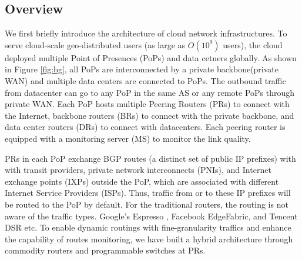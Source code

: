 \subsection{Overview}  %
We first briefly introduce the architecture of cloud network infrastructures. To serve cloud-scale geo-distributed users (as large as $O(10^{9})$ users), the cloud deployed multiple Point of Presences (PoPs) and data cetners globally. As shown in Figure \ref{fig:bg}, all PoPs are interconnected by a private backbone(private WAN) and multiple data centers are connected to PoPs. The outbound traffic from datacenter can go to any PoP in the same AS or any remote PoPs through private WAN. Each PoP hosts multiple Peering Routers (PRs) to connect with the Internet, backbone routers (BRs) to connect with the private backbone, and data center routers (DRs) to connect with datacenters. Each peering router is equipped with a monitoring server (MS) to monitor the link quality.

PRs in each PoP exchange BGP routes (a distinct set of public IP prefixes) with with transit providers, private network interconnects (PNIs), and Internet exchange points (IXPs) outside the PoP, which are associated with different Internet Service Providers (ISPs). Thus, traffic from or to these IP prefixes will be routed to the PoP by default. For the traditional routers, the routing is not aware of the traffic types. Google’s Espresso \cite{yap2017espresso}, Facebook EdgeFabric\cite{schlinker2017edgefabric}, and Tencent DSR \cite{shao21DSR} etc. To enable dynamic routings with fine-granularity traffics and enhance the capability of routes monitoring, we have built a hybrid architecture through commodity routers and programmable switches at PRs. 



